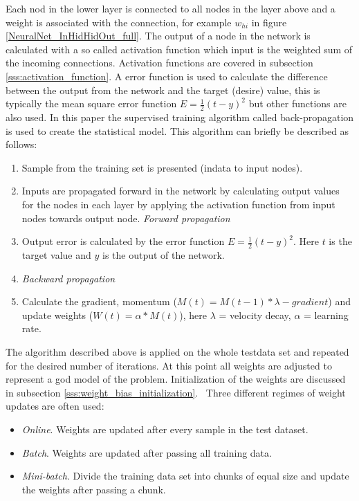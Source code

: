 Each nod in the lower layer is connected to all nodes in the layer above and a weight is associated with the connection, for example $w_{hi}$ in figure \ref{NeuralNet_InHidHidOut_full}. The output of a node in the network is calculated with a so called activation function which input is the weighted sum of the incoming connections. Activation functions are covered in subsection \ref{sss:activation_function}. A error function is used to calculate the difference between the output from the network and the target (desire) value, this is typically the mean square error function $E = \frac{1}{2} (t - y)^{2} $ but other functions are also used. In this paper the supervised training algorithm called back-propagation is used to create the statistical model. This algorithm can briefly be described as follows:
\
\begin{enumerate}
\item Sample from the training set is presented (indata to input nodes).
\item Inputs are propagated forward in the network by calculating output values for the nodes in each layer by applying the activation function from input nodes towards output node. \textit{Forward propagation}
\item Output error is calculated by the error function $ E = \frac{1}{2} (t - y)^{2} $. Here $t$ is the target value and $y$ is the output of the network. 
\item \textit{Backward propagation}
\item Calculate the gradient, momentum ($ M(t) = M(t-1) * \lambda - \textit{gradient}$) and update weights ($ W(t) = \alpha * M(t)$), here $\lambda$ = velocity decay, $\alpha$ = learning rate.
\end{enumerate} 
The algorithm described above is applied on the whole testdata set and repeated for the desired number of iterations. At this point all weights are adjusted to represent a god model of the problem. Initialization of the weights are discussed in subsection \ref{sss:weight_bias_initialization}. 
\
Three different regimes of weight updates are often used:
\begin{itemize}
\item \textit{Online}. Weights are updated after every sample in the test dataset. 
\item \textit{Batch}. Weights are updated after passing all training data.
\item \textit{Mini-batch}. Divide the training data set into chunks of equal size and update the weights after passing a chunk.
\end{itemize} 

